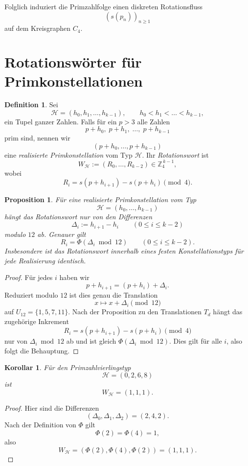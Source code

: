 \documentclass[11pt]{article}
\newtheorem{corollary}{Korollar}
\newtheorem{proposition}{Proposition}
\theoremstyle{definition}
\newtheorem{definition}{Definition}
\begin{document}
Folglich induziert die Primzahlfolge einen diskreten Rotationsfluss
\[
(s(p_n))_{n\ge 1}
\]
auf dem Kreisgraphen $C_4$.

\section{Rotationsw\"orter f\"ur Primkonstellationen}

\begin{definition}
Sei
\[
\mathcal{H}=(h_0,h_1,\dots,h_{k-1}),\qquad h_0<h_1<\dots<h_{k-1},
\]
ein Tupel ganzer Zahlen. Falls f\"ur ein $p>3$ alle Zahlen
\[
p+h_0,\;p+h_1,\;\dots,\;p+h_{k-1}
\]
prim sind, nennen wir
\[
(p+h_0,\dots,p+h_{k-1})
\]
eine \emph{realisierte Primkonstellation} vom Typ $\mathcal{H}$.
Ihr \emph{Rotationswort} ist
\[
W_{\mathcal{H}}:=(R_0,\dots,R_{k-2})\in\mathbb{Z}_4^{\,k-1},
\]
wobei
\[
R_i=s(p+h_{i+1})-s(p+h_i)\pmod 4.
\]
\end{definition}

\begin{proposition}
F\"ur eine realisierte Primkonstellation vom Typ
\[
\mathcal{H}=(h_0,\dots,h_{k-1})
\]
h\"angt das Rotationswort nur von den Differenzen
\[
\Delta_i:=h_{i+1}-h_i\qquad (0\le i\le k-2)
\]
modulo $12$ ab. Genauer gilt
\[
R_i=\Phi(\Delta_i\bmod 12)\qquad (0\le i\le k-2).
\]
Insbesondere ist das Rotationswort innerhalb eines festen Konstellationstyps
f\"ur jede Realisierung identisch.
\end{proposition}

\begin{proof}
F\"ur jedes $i$ haben wir
\[
p+h_{i+1}=(p+h_i)+\Delta_i.
\]
Reduziert modulo $12$ ist dies genau die Translation
\[
x\longmapsto x+\Delta_i \pmod{12}
\]
auf $U_{12}=\{1,5,7,11\}$. Nach der Proposition zu den Translationen $T_d$
h\"angt das zugeh\"orige Inkrement
\[
R_i=s(p+h_{i+1})-s(p+h_i)\pmod 4
\]
nur von $\Delta_i\bmod 12$ ab und ist gleich $\Phi(\Delta_i\bmod 12)$.
Dies gilt f\"ur alle $i$, also folgt die Behauptung.
\end{proof}

\begin{corollary}
F\"ur den Primzahlvierlingstyp
\[
\mathcal{H}=(0,2,6,8)
\]
ist
\[
W_{\mathcal{H}}=(1,1,1).
\]
\end{corollary}

\begin{proof}
Hier sind die Differenzen
\[
(\Delta_0,\Delta_1,\Delta_2)=(2,4,2).
\]
Nach der Definition von $\Phi$ gilt
\[
\Phi(2)=\Phi(4)=1,
\]
also
\[
W_{\mathcal{H}}=(\Phi(2),\Phi(4),\Phi(2))=(1,1,1).
\]
\end{proof}
\end{document}
